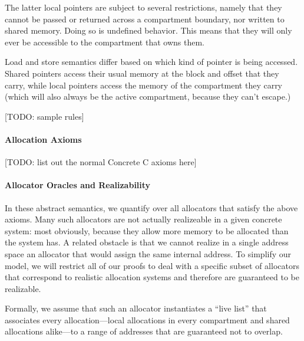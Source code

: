 \documentclass{article}
\begin{document}
The latter local pointers are subject to several restrictions, namely that they cannot be
passed or returned across a compartment boundary, nor written to shared memory. Doing so
is undefined behavior. This means that they will only ever be accessible to the compartment
that owns them. 

Load and store semantics differ based on which kind of pointer is being accessed.
Shared pointers access their usual memory at the block and offset that they carry,
while local pointers access the memory of the compartment they carry (which will also
always be the active compartment, because they can't escape.)

[TODO: sample rules]

\paragraph{Allocation Axioms}

[TODO: list out the normal Concrete C axioms here]

\paragraph{Allocator Oracles and Realizability}


In these abstract semantics, we quantify over all allocators that satisfy the above axioms.
Many such allocators are not actually realizeable in a given concrete system: most obviously,
because they allow more memory to be allocated than the system has. A related obstacle is that
we cannot realize in a single address space an allocator that would assign the same internal
address. To simplify our model, we will restrict all of our proofs to deal with a specific subset of
allocators that correspond to realistic allocation systems and therefore are guaranteed to be
realizable.

Formally, we assume that such an allocator instantiates a ``live list'' that associates
every allocation---local allocations in every compartment and shared allocations alike---to
a range of addresses that are guaranteed not to overlap.
\end{document}
